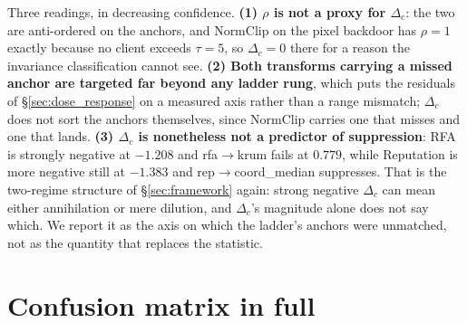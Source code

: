 \documentclass{article}
\begin{document}
\noindent Three readings, in decreasing confidence. \textbf{(1) $\rho$ is not a proxy for $\Delta_c$}: the two are anti-ordered on the anchors, and NormClip on the pixel backdoor has $\rho = 1$ exactly because no client exceeds $\tau{=}5$, so $\Delta_c = 0$ there for a reason the invariance classification cannot see. \textbf{(2) Both transforms carrying a missed anchor are targeted far beyond any ladder rung}, which puts the residuals of \S\ref{sec:dose_response} on a measured axis rather than a range mismatch; $\Delta_c$ does not sort the anchors themselves, since NormClip carries one that misses and one that lands. \textbf{(3) $\Delta_c$ is nonetheless not a predictor of suppression}: RFA is strongly negative at $-1.208$ and rfa$\to$krum fails at $0.779$, while Reputation is more negative still at $-1.383$ and rep$\to$coord\_median suppresses. That is the two-regime structure of \S\ref{sec:framework} again: strong negative $\Delta_c$ can mean either annihilation or mere dilution, and $\Delta_c$'s magnitude alone does not say which. We report it as the axis on which the ladder's anchors were unmatched, not as the quantity that replaces the statistic.

\section{Confusion matrix in full}
\label{app:confusion}
\end{document}
